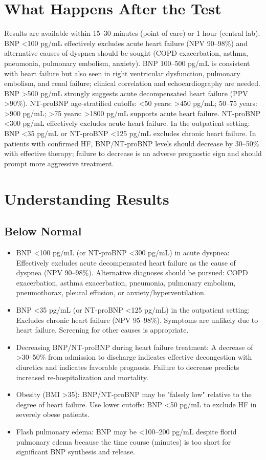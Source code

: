\section*{What Happens After the Test}
Results are available within 15--30 minutes (point of care) or 1 hour (central lab). BNP <100 pg/mL effectively excludes acute heart failure (NPV 90--98\%) and alternative causes of dyspnea should be sought (COPD exacerbation, asthma, pneumonia, pulmonary embolism, anxiety). BNP 100--500 pg/mL is consistent with heart failure but also seen in right ventricular dysfunction, pulmonary embolism, and renal failure; clinical correlation and echocardiography are needed. BNP >500 pg/mL strongly suggests acute decompensated heart failure (PPV >90\%). NT-proBNP age-stratified cutoffs: <50 years: >450 pg/mL; 50--75 years: >900 pg/mL; >75 years: >1800 pg/mL supports acute heart failure. NT-proBNP <300 pg/mL effectively excludes acute heart failure. In the outpatient setting: BNP <35 pg/mL or NT-proBNP <125 pg/mL excludes chronic heart failure. In patients with confirmed HF, BNP/NT-proBNP levels should decrease by 30--50\% with effective therapy; failure to decrease is an adverse prognostic sign and should prompt more aggressive treatment.

\section*{Understanding Results}

\subsection*{Below Normal}
\begin{itemize}
  \item BNP <100 pg/mL (or NT-proBNP <300 pg/mL) in acute dyspnea: Effectively excludes acute decompensated heart failure as the cause of dyspnea (NPV 90--98\%). Alternative diagnoses should be pursued: COPD exacerbation, asthma exacerbation, pneumonia, pulmonary embolism, pneumothorax, pleural effusion, or anxiety/hyperventilation.
  \item BNP <35 pg/mL (or NT-proBNP <125 pg/mL) in the outpatient setting: Excludes chronic heart failure (NPV 95--98\%). Symptoms are unlikely due to heart failure. Screening for other causes is appropriate.
  \item Decreasing BNP/NT-proBNP during heart failure treatment: A decrease of >30--50\% from admission to discharge indicates effective decongestion with diuretics and indicates favorable prognosis. Failure to decrease predicts increased re-hospitalization and mortality.
  \item Obesity (BMI >35): BNP/NT-proBNP may be "falsely low" relative to the degree of heart failure. Use lower cutoffs: BNP <50 pg/mL to exclude HF in severely obese patients.
  \item Flash pulmonary edema: BNP may be <100--200 pg/mL despite florid pulmonary edema because the time course (minutes) is too short for significant BNP synthesis and release.
\end{itemize}

